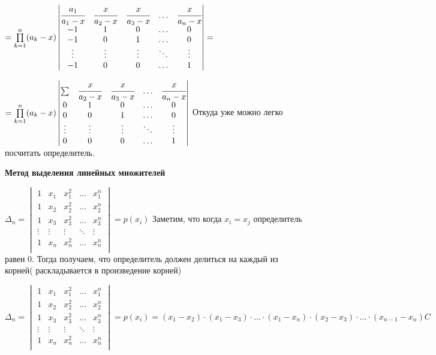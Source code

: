 \( =
\prod\limits_{k=1}^n (a_k-x)
\begin{vmatrix}
    \cfrac{a_1}{a_1-x} & \cfrac{x}{a_2-x} & \cfrac{x}{a_3-x} & \ldots & \cfrac{x}{a_n-x} \\
    -1                 & 1                & 0                & \ldots & 0                \\
    -1                 & 0                & 1                & \ldots & 0                \\
    \vdots             & \vdots           & \vdots           & \ddots & \vdots           \\
    -1                 & 0                & 0                & \ldots & 1                \\
\end{vmatrix}
= \)

\(=
\prod\limits_{k=1}^n (a_k-x)
\begin{vmatrix}
    \sum   & \cfrac{x}{a_2-x} & \cfrac{x}{a_3-x} & \ldots & \cfrac{x}{a_n-x} \\
    0      & 1                & 0                & \ldots & 0                \\
    0      & 0                & 1                & \ldots & 0                \\
    \vdots & \vdots           & \vdots           & \ddots & \vdots           \\
    0      & 0                & 0                & \ldots & 1                \\
\end{vmatrix}
\)
Откуда уже можно легко посчитать определитель.

\textbf{Метод выделения линейных множителей}


\(
\Delta_n = \begin{vmatrix}
    1      & x_1    & x_1^2  & \ldots & x_1^n  \\
    1      & x_2    & x_2^2  & \ldots & x_2^n  \\
    1      & x_3    & x_3^2  & \ldots & x_3^n  \\
    \vdots & \vdots & \vdots & \ddots & \vdots \\
    1      & x_n    & x_n^2  & \ldots & x_n^n  \\
\end{vmatrix} = p(x_i)
\)
Заметим, что когда \(x_i  = x_j \) определитель равен 0. Тогда получаем, что определитель должен делиться на каждый из корней( раскладывается в произведение корней)

\(
\Delta_n = \begin{vmatrix}
    1      & x_1    & x_1^2  & \ldots & x_1^n  \\
    1      & x_2    & x_2^2  & \ldots & x_2^n  \\
    1      & x_3    & x_3^2  & \ldots & x_3^n  \\
    \vdots & \vdots & \vdots & \ddots & \vdots \\
    1      & x_n    & x_n^2  & \ldots & x_n^n  \\
\end{vmatrix} = p(x_i) = (x_1 - x_2) \cdot (x_1  - x_3) \cdot \ldots \cdot (x_1 - x_n) \cdot (x_2 - x_3) \cdot \ldots \cdot (x_{n-1}-x_n) C
\)

